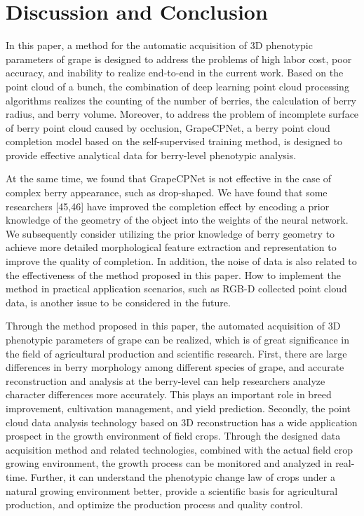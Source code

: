 \documentclass[12pt]{article}
\begin{document}
\section{Discussion and Conclusion}

In this paper, a method for the automatic acquisition of 3D phenotypic parameters of grape is designed to address the problems of high labor cost, poor accuracy, and inability to realize end-to-end in the current work. 
Based on the point cloud of a bunch, the combination of deep learning point cloud processing algorithms realizes the counting of the number of berries, the calculation of berry radius, and berry volume. 
Moreover, to address the problem of incomplete surface of berry point cloud caused by occlusion, GrapeCPNet, a berry point cloud completion model based on the self-supervised training method, is designed to provide effective analytical data for berry-level phenotypic analysis.

At the same time, we found that GrapeCPNet is not effective in the case of complex berry appearance, such as drop-shaped. 
We have found that some researchers [45,46] have improved the completion effect by encoding a prior knowledge of the geometry of the object into the weights of the neural network. 
We subsequently consider utilizing the prior knowledge of berry geometry to achieve more detailed morphological feature extraction and representation to improve the quality of completion. 
In addition, the noise of data is also related to the effectiveness of the method proposed in this paper. 
How to implement the method in practical application scenarios, such as RGB-D collected point cloud data, is another issue to be considered in the future. 

Through the method proposed in this paper, the automated acquisition of 3D phenotypic parameters of grape can be realized, which is of great significance in the field of agricultural production and scientific research. 
First, there are large differences in berry morphology among different species of grape, and accurate reconstruction and analysis at the berry-level can help researchers analyze character differences more accurately. 
This plays an important role in breed improvement, cultivation management, and yield prediction. 
Secondly, the point cloud data analysis technology based on 3D reconstruction has a wide application prospect in the growth environment of field crops. 
Through the designed data acquisition method and related technologies, combined with the actual field crop growing environment, the growth process can be monitored and analyzed in real-time. 
Further, it can understand the phenotypic change law of crops under a natural growing environment better, provide a scientific basis for agricultural production, and optimize the production process and quality control.
\end{document}
